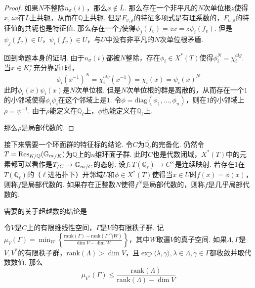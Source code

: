 \begin{proof}
    如果$N$不整除$n_{\sigma}(i)$，那么$x\not\in \overline{L}$. 那么存在一个非平凡的$N$次单位根$z$使得$x, zx$在$\overline{L}$上共轭，从而在$\mathbb{Q}$上共轭. 但是$F_{v,\rho}$的特征多项式是有理系数的，$F_{v,\rho}$的特征值的共轭也是特征值. 那么存在一个$j$使得$\psi_j(f_v) = zx = z\psi_i(f_v)$. 但是$\psi_j(f_v)\in U$，$\psi_i(f_v)\in U$，与$U$中没有非平凡的$N$次单位根矛盾.

    \vskip0.3cm

    回到命题本身的证明. 由于$n_{\sigma}(i)$都被$N$整除，存在$\phi_i\in X^{*}(T)$使得$\phi_i^N = \chi_i^{alg}$. 当$x\in K_{\ell}^{\times}$充分靠近$1$时，
    \begin{equation}
        \phi_i(x^{-1})^N = \chi_i^{alg}(x^{-1}) = \chi_i(x) = \psi_i(x)^N
    \end{equation}
    此时$\phi_i(x)\psi_i(x)$是$N$次单位根. 但是$N$次单位根的群是离散的，从而存在一个$1$的小邻域使得$\phi_i\psi_i$在这个邻域上是$1$. 令$\phi=\mathrm{diag}(\phi_1,\ldots,\phi_n)$，则在$1$的小邻域上$\rho = \psi^{-1}$. 由于$\rho$能定义在$\mathbb{Q}_{\ell}$上，$\phi$也能定义在$\mathbb{Q}_{\ell}$上.

    那么$\rho$是局部代数的.
\end{proof}

接下来需要一个环面群的特征标的结论.
令$C$为$\overline{\mathbb{Q}_{\ell}}$的完备化. 仍然令$T=\mathrm{Res}_{K/\mathbb{Q}}({\mathbb{G}_m}_{/K})$为$\mathbb{Q}$上的$n$维环面子群. 此时$C$也是代数闭域，$X^{*}(T)$中的元素都可以看作是${T}_{/C}\to {\mathbb{G}_m}_{/C}$的态射.
设$f: T(\mathbb{Q}_{\ell})\to C^{\times}$是连续映射. 若存在$1$在$T(\mathbb{Q}_{\ell})$的（$\ell$进拓扑下）开邻域$U$和$\phi\in X^{*}(T)$使得当$x\in U$时$f(x)=\phi(x)$，则称$f$是局部代数的. 如果存在正整数$N$使得$f^N$是局部代数的，则称$f$是几乎局部代数的.

需要的关于超越数的结论是
\begin{cprop}
    令$V$是$C$上的有限维线性空间，$\Gamma$是$V$的有限秩子群. 记$\mu_{V}(\Gamma) = \min_W \left\{ \frac{\mathrm{rank}(\Gamma) - \mathrm{rank}(\Gamma \bigcap W)}{\dim V-\dim W} \right\}$，其中$W$取遍$V$的真子空间. 如果$\Lambda, \Gamma$是$V, V^{*}$的有限秩子群，$\mathrm{rank}(\Lambda)>\dim V$，且$\exp\langle \lambda, \gamma\rangle, \lambda \in \Lambda, \gamma\in \Gamma$都收敛并取代数数值. 那么
    \begin{equation}
        \mu_{V^{*}}(\Gamma)\leq \frac{\mathrm{rank}(\Lambda)}{\mathrm{rank}(\Lambda) - \dim V}
    \end{equation}\label{temp::theo8}
\end{cprop}

